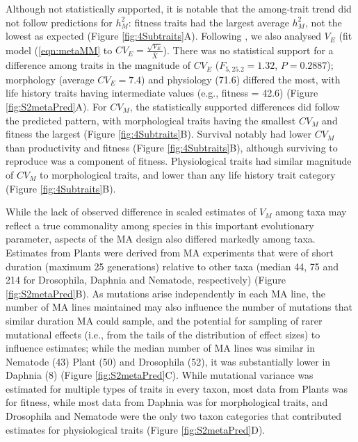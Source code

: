Although not statistically supported, it is notable that the among-trait trend did not follow predictions for $h_M^2$: fitness traits had the largest average $h_M^2$, not the lowest as expected (Figure \ref{fig:4Subtraits}A). Following \citet{Houl96}, we also analysed $V_E$ (fit model (\ref{eqn:metaMM} to $CV_E = \frac{\sqrt{V_E}}{\bar{X}}$). There was no statistical support for a difference among traits in the magnitude of $CV_E$ ($F_{5,25.2} = 1.32$, $P = 0.2887$); morphology (average $CV_E = 7.4$) and physiology (71.6) differed the most, with life history traits having intermediate values (e.g., fitness = 42.6) (Figure \ref{fig:S2metaPred}A). For $CV_M$, the statistically supported differences did follow the predicted pattern, with morphological traits having the smallest $CV_M$ and fitness the largest (Figure \ref{fig:4Subtraits}B). Survival notably had lower $CV_M$ than productivity and fitness (Figure \ref{fig:4Subtraits}B), although surviving to reproduce was a component of fitness. Physiological traits had similar magnitude of $CV_M$ to morphological traits, and lower than any life history trait category (Figure \ref{fig:4Subtraits}B).\par

While the lack of observed difference in scaled estimates of $V_M$ among taxa may reflect a true commonality among species in this important evolutionary parameter, aspects of the MA design also differed markedly among taxa. Estimates from Plants were derived from MA experiments that were of short duration (maximum 25 generations) relative to other taxa (median 44, 75 and 214 for Drosophila, Daphnia and Nematode, respectively) (Figure \ref{fig:S2metaPred}B). As mutations arise independently in each MA line, the number of MA lines maintained may also influence the number of mutations that similar duration MA could sample, and the potential for sampling of rarer mutational effects (i.e., from the tails of the distribution of effect sizes) to influence estimates; while the median number of 
MA lines was similar in Nematode (43) Plant (50) and Drosophila (52), it was substantially lower in Daphnia (8) (Figure \ref{fig:S2metaPred}C). While mutational variance was estimated for multiple types of traits in every taxon, most data from Plants was for fitness, while most data from Daphnia was for morphological traits, and Drosophila and Nematode were the only two taxon categories that contributed estimates for physiological traits (Figure \ref{fig:S2metaPred}D).\par
